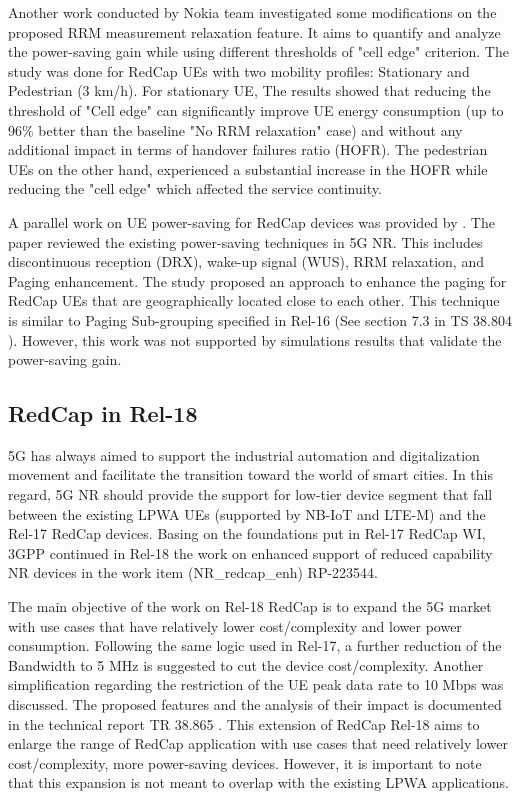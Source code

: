 \documentclass[conference]{IEEEtran}
\begin{document}
Another work conducted by Nokia team \cite{tayyab_rrm_2021} investigated some modifications on the proposed RRM measurement relaxation feature. It aims to quantify and analyze the power-saving gain while using different thresholds of "cell edge" criterion. The study was done for RedCap UEs with two mobility profiles: Stationary and Pedestrian (3 km/h). For stationary UE, The results showed that reducing the threshold of "Cell edge" can significantly improve UE energy consumption (up to 96\% better than the baseline "No RRM relaxation" case) and without any additional impact in terms of handover failures ratio (HOFR). The pedestrian UEs on the other hand, experienced a substantial increase in the HOFR while reducing the "cell edge" which affected the service continuity.

A parallel work on UE power-saving for RedCap devices was provided by \cite{li_radio_2022}. The paper reviewed the existing power-saving techniques in 5G NR. This includes discontinuous reception (DRX), wake-up signal (WUS), RRM relaxation, and Paging enhancement.  The study proposed an approach to enhance the paging for RedCap UEs that are geographically located close to each other. This technique is similar to Paging Sub-grouping specified in Rel-16 (See section 7.3 in TS 38.804 \cite{3gpp_study_nodate-4_38.804}). However, this work was not supported by simulations results that validate the power-saving gain.   

\subsection{RedCap in Rel-18}
5G has always aimed to support the industrial automation and digitalization movement and facilitate the transition toward the world of smart cities. In this regard, 5G NR should provide the support for low-tier device segment that fall between the existing LPWA UEs (supported by NB-IoT and LTE-M) and the Rel-17 RedCap devices. Basing on the foundations put in Rel-17 RedCap WI, 3GPP continued in Rel-18 the work on enhanced support of reduced capability NR devices in the work item (NR\_redcap\_enh) \cite{3gpp_revised_2022_RP-223544} RP-223544.

The main objective of the work on Rel-18 RedCap is to expand the 5G market with use cases that have relatively lower cost/complexity and lower power consumption. Following the same logic used in Rel-17, a further reduction of the Bandwidth to 5 MHz is suggested to cut the device cost/complexity. Another simplification regarding the restriction of the UE peak data rate to 10 Mbps was discussed. The proposed features and the analysis of their impact is documented in the technical report TR 38.865 \cite{3gpp_study_2022_38.865}. This extension of RedCap Rel-18 aims to enlarge the range of RedCap application with use cases that need relatively lower cost/complexity, more power-saving devices. However, it is important to note that this expansion is not meant to overlap with the existing LPWA applications.
\end{document}
